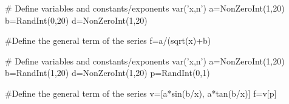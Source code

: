 \begin{sagesilent}
# Define variables and constants/exponents
var('x,n')
a=NonZeroInt(1,20)
b=RandInt(0,20)
d=NonZeroInt(1,20)

#Define the general term of the series
f=a/(sqrt(x)+b)

\end{sagesilent}


\begin{sagesilent}
# Define variables and constants/exponents
var('x,n')
a=NonZeroInt(1,20)
b=RandInt(1,20)
d=NonZeroInt(1,20)
p=RandInt(0,1)

#Define the general term of the series
v=[a*sin(b/x), a*tan(b/x)]
f=v[p]

\end{sagesilent}


